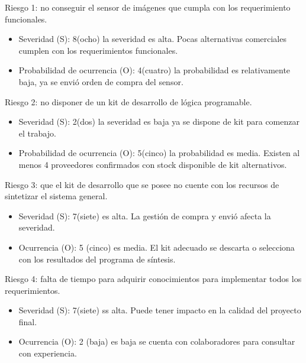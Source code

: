 \documentclass[
11pt, %
codirector, %
]{charter}
\begin{document}
Riesgo 1: no conseguir el sensor de imágenes que cumpla con los requerimiento funcionales.
\begin{itemize}
	\item Severidad (S): 8(ocho) la severidad es alta. Pocas alternativas comerciales cumplen con los requerimientos funcionales.\\
	
	\item Probabilidad de ocurrencia (O): 4(cuatro) la probabilidad es relativamente baja, ya se envió orden de compra del sensor.
\end{itemize}  
 
 
Riesgo 2: no disponer de un kit de desarrollo de lógica programable.
\begin{itemize}
	\item Severidad (S): 2(dos) la severidad es baja ya  se dispone de kit para comenzar el trabajo.\\
	\item Probabilidad de ocurrencia (O): 5(cinco) la probabilidad es media. Existen al menos 4 proveedores confirmados con stock disponible de kit alternativos. 
\end{itemize}  


Riesgo 3: que el kit de desarrollo que se posee no cuente con los recursos de sintetizar el sistema general.
\begin{itemize}
	\item Severidad (S): 7(siete)  es alta. La gestión de compra y envió afecta la severidad.
	\item Ocurrencia (O): 5 (cinco) es media. El kit adecuado se descarta o selecciona con los resultados del programa de síntesis.
\end{itemize}

Riesgo 4: falta de tiempo para adquirir conocimientos para implementar todos los requerimientos.

\begin{itemize}
	\item Severidad (S): 7(siete) ss alta. Puede tener impacto en la calidad del proyecto final.
 
\item Ocurrencia (O): 2 (baja) es baja se cuenta con colaboradores para consultar con experiencia. 
\end{itemize}
\end{document}
